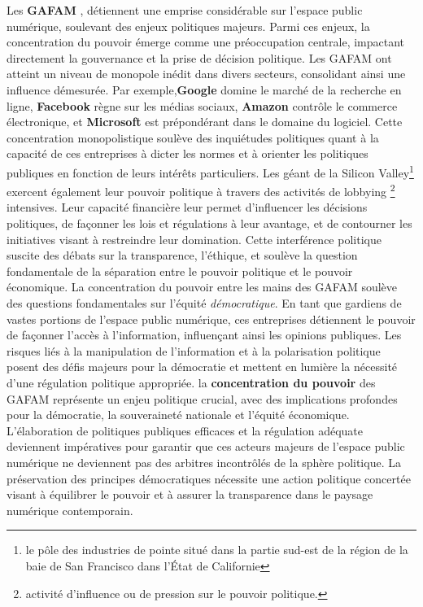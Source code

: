 \documentclass[12pt,a4paper]{article} %
\begin{document}
	Les \textbf{GAFAM} , détiennent une emprise considérable sur l'espace public numérique, soulevant des enjeux politiques majeurs. Parmi ces enjeux, la concentration du pouvoir émerge comme une préoccupation centrale, impactant directement la gouvernance et la prise de décision politique.
	Les GAFAM ont atteint un niveau de monopole inédit dans divers secteurs, consolidant ainsi une influence démesurée. Par exemple,\textbf{Google} domine le marché de la recherche en ligne, \textbf{Facebook} règne sur les médias sociaux, \textbf{Amazon} contrôle le commerce électronique, et \textbf{Microsoft} est prépondérant dans le domaine du logiciel. Cette concentration monopolistique soulève des inquiétudes politiques quant à la capacité de ces entreprises à dicter les normes et à orienter les politiques publiques en fonction de leurs intérêts particuliers.
	Les géant de la Silicon Valley\footnote[6]{le pôle des industries de pointe situé dans la partie sud-est de la région de la baie de San Francisco dans l'État de Californie}  exercent également leur pouvoir politique à travers des activités de lobbying \footnote[7]{activité d'influence ou de pression sur le pouvoir politique.} intensives. Leur capacité financière leur permet d'influencer les décisions politiques, de façonner les lois et régulations à leur avantage, et de contourner les initiatives visant à restreindre leur domination. Cette interférence politique suscite des débats sur la transparence, l'éthique, et soulève la question fondamentale de la séparation entre le pouvoir politique et le pouvoir économique.
	La concentration du pouvoir entre les mains des GAFAM soulève des questions fondamentales sur l'équité \textit{démocratique}. En tant que gardiens de vastes portions de l'espace public numérique, ces entreprises détiennent le pouvoir de façonner l'accès à l'information, influençant ainsi les opinions publiques. Les risques liés à la manipulation de l'information et à la polarisation politique posent des défis majeurs pour la démocratie et mettent en lumière la nécessité d'une régulation politique appropriée.
	la \textbf{concentration du pouvoir} des GAFAM représente un enjeu politique crucial, avec des implications profondes pour la démocratie, la souveraineté nationale et l'équité économique. L'élaboration de politiques publiques efficaces et la régulation adéquate deviennent impératives pour garantir que ces acteurs majeurs de l'espace public numérique ne deviennent pas des arbitres incontrôlés de la sphère politique. La préservation des principes démocratiques nécessite une action politique concertée visant à équilibrer le pouvoir et à assurer la transparence dans le paysage numérique contemporain.
	
\end{document}
